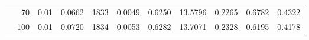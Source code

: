\begin{table}[H]
{\begin{tabular}{crlrrrrrrrr}
	 & 70 & 0.01 & {\cellcolor[HTML]{1717FE}} \color[HTML]{F1F1F1} 0.0662 & {\cellcolor[HTML]{0000FF}} \color[HTML]{F1F1F1} 1833 & {\cellcolor[HTML]{1515FE}} \color[HTML]{F1F1F1} 0.0049 & {\cellcolor[HTML]{0101FF}} \color[HTML]{F1F1F1} 0.6250 & {\cellcolor[HTML]{1B1BFE}} \color[HTML]{F1F1F1} 13.5796 & {\cellcolor[HTML]{CCCCF5}} \color[HTML]{000000} 0.2265 & {\cellcolor[HTML]{0505FF}} \color[HTML]{F1F1F1} 0.6782 & {\cellcolor[HTML]{2727FD}} \color[HTML]{F1F1F1} 0.4322 \\ 
	 & 100 & 0.01 & {\cellcolor[HTML]{0000FF}} \color[HTML]{F1F1F1} 0.0720 & {\cellcolor[HTML]{0000FF}} \color[HTML]{F1F1F1} 1834 & {\cellcolor[HTML]{0000FF}} \color[HTML]{F1F1F1} 0.0053 & {\cellcolor[HTML]{0000FF}} \color[HTML]{F1F1F1} 0.6282 & {\cellcolor[HTML]{1818FE}} \color[HTML]{F1F1F1} 13.7071 & {\cellcolor[HTML]{C5C5F5}} \color[HTML]{000000} 0.2328 & {\cellcolor[HTML]{1919FE}} \color[HTML]{F1F1F1} 0.6195 & {\cellcolor[HTML]{2E2EFD}} \color[HTML]{F1F1F1} 0.4178 \\
	\bottomrule[2.5pt]
\end{tabular}
}
\end{table}

